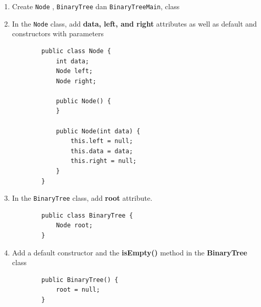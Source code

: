 \documentclass[12pt,titlepage]{article}
\begin{document}
\begin{enumerate}
    \item Create \texttt{Node} , \texttt{BinaryTree} dan \texttt{BinaryTreeMain}, class
    \item In the \texttt{Node} class, add \textbf{data, left, and right} attributes as well as default and constructors with parameters
    \begin{verbatim}
        public class Node {
            int data;
            Node left;
            Node right;

            public Node() {
            }

            public Node(int data) {
                this.left = null;
                this.data = data;
                this.right = null;
            }
        }
    \end{verbatim}
    \item In the \texttt{BinaryTree} class, add \textbf{root} attribute.
    \begin{verbatim}
        public class BinaryTree {
            Node root;
        }
    \end{verbatim}
    \item Add a default constructor and the \textbf{isEmpty()} method in the \textbf{BinaryTree} class
    \begin{verbatim}
        public BinaryTree() {
            root = null;
        }


\end{verbatim}
\end{enumerate}
\end{document}

